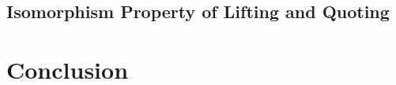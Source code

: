 \documentclass{article}
\begin{document}
\subsection{Isomorphism Property of Lifting and Quoting}





\section{Conclusion}


\printbibliography
\end{document}
